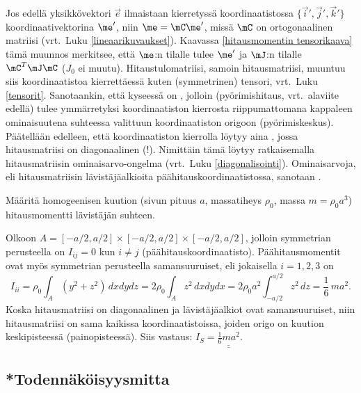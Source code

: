 Jos edellä yksikkövektori $\vec e$ ilmaistaan kierretyssä koordinaatistossa 
$\{\vec i',\vec j', \vec k'\}$ koordinaativektorina $\me'$, niin $\me=\mC\me'$, missä $\mC$ on
ortogonaalinen matriisi (vrt.\ Luku \ref{lineaarikuvaukset}). Kaavassa
\eqref{hitausmomentin tensorikaava} tämä muunnos merkitsee, että $\me$:n tilalle tulee
$\me'$ ja $\mJ$:n tilalle $\mC^T\mJ\mC$ ($J_0$ ei muutu). Hitaustulomatriisi, samoin
hitausmatriisi, muuntuu siis koordinaatistoa kierrettäessä kuten (symmetrinen) tensori,
vrt.\ Luku \ref{tensorit}. Sanotaankin, että kyseessä on , jolloin
 (pyörimishitaus, vrt.\ alaviite edellä) tulee ymmärretyksi koordinaatiston
kierrosta riippumattomana kappaleen ominaisuutena suhteessa valittuun koordinaatiston origoon
(pyörimiskeskus). Päätellään edelleen, että koordinaatiston kierrolla löytyy
aina , jossa hitausmatriisi on diagonaalinen (!). Nimittäin tämä
löytyy ratkaisemalla hitausmatriisin ominaisarvo-ongelma (vrt.\ Luku \ref{diagonalisointi}).
Ominaisarvoja, eli hitausmatriisin
%
lävistäjäalkioita päähitauskoordinaatistossa, sanotaan .
\begin{Exa} Määritä homogeenisen kuution (sivun pituus $a$, massatiheys $\rho_0$, massa 
$m=\rho_0 a^3$) hitausmomentti lävistäjän suhteen.
\end{Exa}
\ratk Olkoon $A=[-a/2,a/2]\times[-a/2,a/2]\times[-a/2,a/2]$, jolloin symmetrian perusteella on
$I_{ij}=0$ kun $i \neq j$ (päähitauskoordinaatisto). Päähitausmomentit ovat myös symmetrian 
perusteella samansuuruiset, eli jokaisella $i=1,2,3$ on
\[
I_{ii} = \rho_0\int_A (y^2+z^2)\,dxdydz = 2\rho_0\int_A z^2\,dxdydx 
       = 2\rho_0 a^2\int_{-a/2}^{a/2} z^2\,dz = \frac{1}{6}\,ma^2.
\]
Koska hitausmatriisi on diagonaalinen ja lävistäjäalkiot ovat samansuuruiset, niin 
hitausmatriisi on sama kaikissa koordinaatistoissa, joiden origo on kuution
keskipisteessä (painopisteessä). Siis vastaus: $I_S=\underline{\underline{\frac{1}{6}ma^2}}$.
\loppu

\subsection*{*Todennäköisyysmitta}


